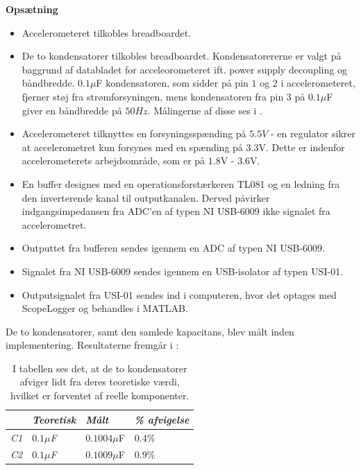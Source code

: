 \textbf{Opsætning}\label{Opsaetning}
\begin{itemize}
\item Accelerometeret tilkobles breadboardet.
\item De to kondensatorer tilkobles breadboardet. Kondensatorererne er valgt på baggrund af databladet for acceleorometeret ift. power supply decoupling og båndbredde. $0.1\mu$F kondensatoren, som sidder på pin $1$ og $2$ i accelerometeret, fjerner støj fra strømforsyningen, mens kondensatoren fra pin $3$ på $0.1\mu$F giver en båndbredde på $50Hz$. Målingerne af disse ses i .
\item Accelerometeret tilknyttes en forsyningsspænding på $5.5V$ - en regulator sikrer at accelerometret kun forsynes med en spænding på $3.3$V. Dette er indenfor accelerometerets arbejdsområde, som er på $1.8$V -  $3.6$V.
\item En buffer designes med en operationsforstærkeren TL081 og en ledning fra den inverterende kanal til outputkanalen. Derved påvirker indgangsimpedansen fra ADC'en af typen NI USB-6009 ikke signalet fra accelerometret.
\item Outputtet fra bufferen sendes igennem en ADC af typen NI USB-6009.
\item Signalet fra NI USB-6009 sendes igennem en USB-isolator af typen USI-01.
\item Outputsignalet fra USI-01 sendes ind i computeren, hvor det optages med ScopeLogger og behandles i MATLAB.
\end{itemize}

\noindent De to kondensatorer, samt den samlede kapacitans, blev målt inden implementering. Resultaterne fremgår i  :
\begin{table}[H]
	\centering
	\begin{tabular}{|l|l|l|l|}\hline
		& \textit{Teoretisk} & \textit{Målt} & \textit{\% afvigelse} \\ \hline
		\textit{C1}       & \textit{$0.1\mu$F} & $0.1004\mu$F  & $0.4\%$               \\ \hline		
		\textit{C2}       & \textit{$0.1\mu$F} & $0.1009\mu$F  & $0.9\%$               \\ \hline
	\end{tabular}
	\caption{I tabellen ses det, at de to kondensatorer afviger lidt fra deres teoretiske værdi, hvilket er forventet af reelle komponenter.}
	\label{Tab:Acc_kondensator_pilot}
\end{table}

